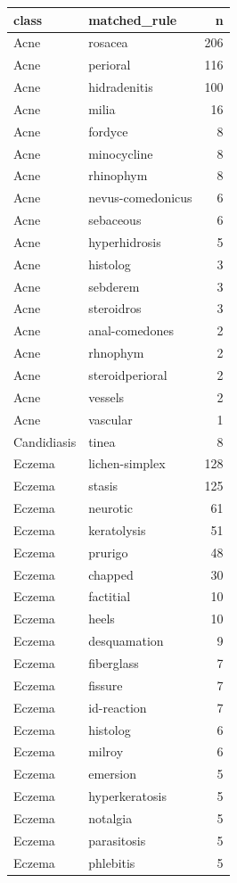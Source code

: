 \begin{tabular}{llr}
\toprule
class & matched\_rule & n \\
\midrule
Acne & rosacea & 206 \\
Acne & perioral & 116 \\
Acne & hidradenitis & 100 \\
Acne & milia & 16 \\
Acne & fordyce & 8 \\
Acne & minocycline & 8 \\
Acne & rhinophym & 8 \\
Acne & nevus-comedonicus & 6 \\
Acne & sebaceous & 6 \\
Acne & hyperhidrosis & 5 \\
Acne & histolog & 3 \\
Acne & sebderem & 3 \\
Acne & steroidros & 3 \\
Acne & anal-comedones & 2 \\
Acne & rhnophym & 2 \\
Acne & steroidperioral & 2 \\
Acne & vessels & 2 \\
Acne & vascular & 1 \\
Candidiasis & tinea & 8 \\
Eczema & lichen-simplex & 128 \\
Eczema & stasis & 125 \\
Eczema & neurotic & 61 \\
Eczema & keratolysis & 51 \\
Eczema & prurigo & 48 \\
Eczema & chapped & 30 \\
Eczema & factitial & 10 \\
Eczema & heels & 10 \\
Eczema & desquamation & 9 \\
Eczema & fiberglass & 7 \\
Eczema & fissure & 7 \\
Eczema & id-reaction & 7 \\
Eczema & histolog & 6 \\
Eczema & milroy & 6 \\
Eczema & emersion & 5 \\
Eczema & hyperkeratosis & 5 \\
Eczema & notalgia & 5 \\
Eczema & parasitosis & 5 \\
Eczema & phlebitis & 5 \\

\end{tabular}
